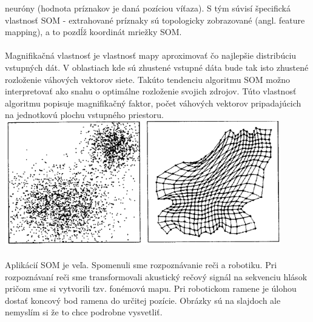 \documentclass{article}
\numberwithin{equation}{section} %
\begin{document}
neuróny (hodnota príznakov je daná pozíciou víťaza). S tým súvisí špecifická vlastnosť
SOM - extrahované príznaky sú topologicky zobrazované (angl. feature mapping), a to
pozdĺž koordinát mriežky SOM.
\\\\
Magnifikačná vlastnosť je vlastnosť mapy aproximovať čo najlepšie distribúciu vstupných dát. V oblastiach kde sú zhustené vstupné dáta bude tak isto zhustené rozloženie váhových vektorov siete. Takúto tendenciu algoritmu SOM možno interpretovať ako snahu o optimálne rozloženie svojich zdrojov. Túto vlastnosť algoritmu popisuje magnifikačný faktor, počet  váhových vektorov pripadajúcich na jednotkovú plochu vstupného priestoru.\\
\includegraphics[width=12cm]{imgs/magnif}
\\\\
Aplikácií SOM je veľa. Spomenuli sme rozpoznávanie reči a robotiku. Pri rozpoznávaní reči sme transformovali akustický rečový signál na sekvenciu hlások pričom sme si vytvorili tzv. fonémovú mapu. Pri robotickom ramene je úlohou dostať koncový bod ramena do určitej pozície. Obrázky sú na slajdoch ale nemyslím si že to chce podrobne vysvetliť.
\end{document}
